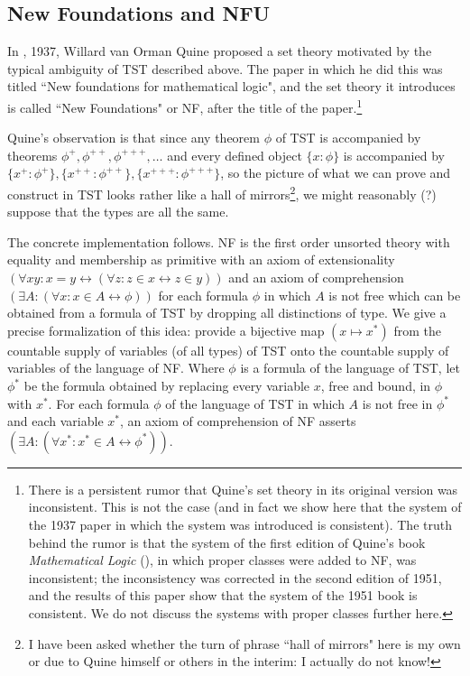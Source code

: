 \documentclass{article}
\theoremstyle{definition}
\theoremstyle{remark}
\begin{document}
{\newpage

\subsection{New Foundations and NFU}

In \cite{nf}, 1937, Willard van Orman Quine proposed a set theory motivated by the typical ambiguity of TST described above.  The paper in which he did this was titled ``New foundations for mathematical logic", and the set theory it introduces is called ``New Foundations" or NF, after the title of the paper.\footnote{There is a persistent rumor that Quine's set theory in its original version was inconsistent.  This is not the case (and in fact we show here that the system of the 1937 paper in which the system was introduced is consistent).  The truth behind the rumor is that the system of the first edition of Quine's book {\em Mathematical Logic\/} (\cite{ml}), in which proper classes were added to NF, was inconsistent;  the inconsistency was corrected in the second edition of 1951, and the results of this paper show that the system of the 1951 book is consistent.  We do not discuss the systems with proper classes further here.}

Quine's observation is that since any theorem $\phi$ of TST is accompanied by theorems $\phi^+, \phi^{++}, \phi^{+++}, \ldots$ and every defined object $\{x:\phi\}$ is accompanied by
$\{x^+:\phi^+\},\{x^{++}:\phi^{++}\},\{x^{+++}:\phi^{+++}\}$, so the picture of what we can prove and construct in TST looks rather like a hall of mirrors\footnote{I have been asked whether the turn of phrase ``hall of mirrors" here is my own or due to Quine himself or others in the interim:  I actually do not know!}, we might reasonably (?) suppose that the types are all the same.

The concrete implementation follows.  NF is the first order unsorted theory with equality and membership as primitive with an axiom of extensionality $(\forall xy:x=y \leftrightarrow (\forall z:z \in x \leftrightarrow z\in y))$ and an axiom of comprehension $(\exists A:(\forall x:x \in A \leftrightarrow \phi))$ for each formula $\phi$ in which $A$ is not free which can be obtained from a formula of TST by dropping all distinctions of type.  We give a precise formalization of this idea:  provide a bijective map $(x \mapsto x^*)$ from the countable supply of variables (of all types) of TST onto the countable supply of variables of the language of NF.  Where $\phi$ is a formula of the language of TST, let $\phi^*$ be the formula obtained by replacing every variable $x$, free and bound,
in $\phi$ with $x^*$. For each formula $\phi$ of the language of TST in which $A$ is not free in $\phi^*$ and each variable $x^*$, an axiom of comprehension of NF asserts $(\exists A:(\forall x^*:x^* \in A \leftrightarrow \phi^*))$.



}
\end{document}
